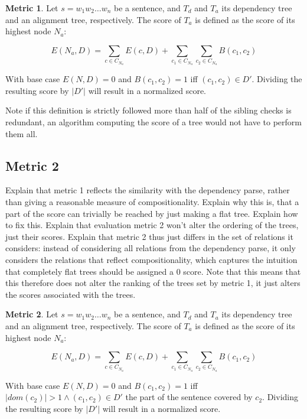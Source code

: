 \documentclass{report}
\theoremstyle{definition}
\newtheorem{metric}{Metric}
\theoremstyle{plain}
\begin{document}
\begin{metric}\label{m1}
Let $s = w_1 w_2 \dots w_n$ be a sentence, and $T_d$ and $T_a$ its dependency tree and an alignment tree, respectively. The score of $T_a$ is defined as the score of its highest node $N_{a}$:

$$
E(N_a,D) = \sum_{c\in C_{N_a}} E(c,D)+ \sum_{c_1\in C_{N_a}} \sum_{c_2\in C_{N_a}} B(c_1,c_2)
$$

\noindent With base case $E(N,D) = 0$ and $B(c_1,c_2) = 1$ iff  $(c_1,c_2)\in D'$. Dividing the resulting score by $|D'|$ will result in a normalized score.
\end{metric}

\noindent  Note if this definition is strictly followed more than half of the sibling checks is redundant, an algorithm computing the score of a tree would not have to perform them all.

\subsection{Metric 2}

Explain that metric 1 reflects the similarity with the dependency parse, rather than giving a reasonable measure of compositionality. Explain why this is, that a part of the score can trivially be reached by just making a flat tree. Explain how to fix this. Explain that evaluation metric 2 won't alter the ordering of the trees, just their scores.
Explain that metric 2 thus just differs in the set of relations it considers: instead of considering all relations from the dependency parse, it only considers the relations that reflect compositionality, which captures the intuition that completely flat trees should be assigned a 0 score. Note that this means that this therefore does not alter the ranking of the trees set by metric 1, it just alters the scores associated with the trees.

\begin{metric}\label{m2}
Let $s = w_1 w_2 \dots w_n$ be a sentence, and $T_d$ and $T_a$ its dependency tree and an alignment tree, respectively. The score of $T_a$ is defined as the score of its highest node $N_{a}$:

$$
E(N_a,D) = \sum_{c\in C_{N_a}} E(c,D)+ \sum_{c_1\in C_{N_a}} \sum_{c_2\in C_{N_a}} B(c_1,c_2)
$$

\noindent With base case $E(N,D) = 0$ and $B(c_1,c_2) = 1$ iff  $|dom(c_2)| > 1 \land (c_1,c_2)\in D'$ the part of the sentence covered by $c_2$. Dividing the resulting score by $|D'|$ will result in a normalized score.
\end{metric}
\end{document}
